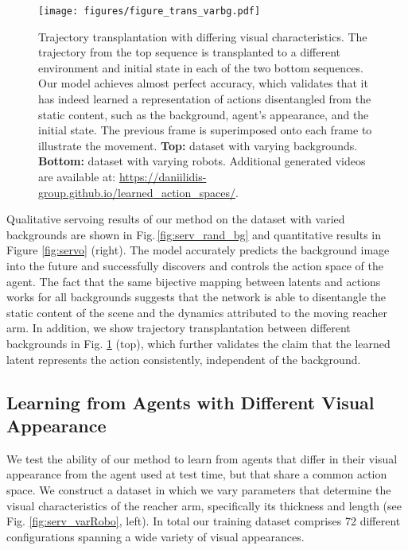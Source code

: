 \documentclass{article} %
\begin{document}
\begin{figure}
\centering
\hspace{0.25cm}
\texttt{[image: figures/figure\_trans\_varbg.pdf]}
\vspace{-15pt}
\caption{Trajectory transplantation with differing visual characteristics. The trajectory from the top sequence is transplanted to a different environment and initial state in each of the two bottom sequences. Our model achieves almost perfect accuracy, which validates that it has indeed learned a representation of actions disentangled from the static content, such as the background, agent's appearance, and the initial state. The previous frame is superimposed onto each frame to illustrate the movement. \textbf{Top:} dataset with varying backgrounds. \textbf{Bottom:} dataset with varying robots. Additional generated videos are available at: \url{https://daniilidis-group.github.io/learned_action_spaces/}.} 
   \label{fig:trans_varbg}
   \vspace{-12pt}
\end{figure}Qualitative servoing results of our method on the dataset with varied backgrounds are shown in Fig.\,\ref{fig:serv_rand_bg} and quantitative results in Figure \ref{fig:servo} (right). The model accurately predicts the background image into the future and successfully discovers and controls the action space of the agent. The fact that the same bijective mapping between latents and actions works for all backgrounds suggests that the network is able to disentangle the static content of the scene and the dynamics attributed to the moving reacher arm. In addition, we show trajectory transplantation between different backgrounds in Fig. \ref{fig:trans_varbg} (top), which further validates the claim that the learned latent represents the action consistently, independent of the background. 

\subsection{Learning from Agents with Different Visual Appearance}

We test the ability of our method to learn from agents that differ in their visual appearance from the agent used at test time, but that share a common action space. %
We construct a dataset in which we vary parameters that determine the visual characteristics of the reacher arm, specifically its thickness and length (see Fig. \ref{fig:serv_varRobo}, left). In total our training dataset comprises \SI{72}{} different configurations spanning a wide variety of visual appearances.
\end{document}
